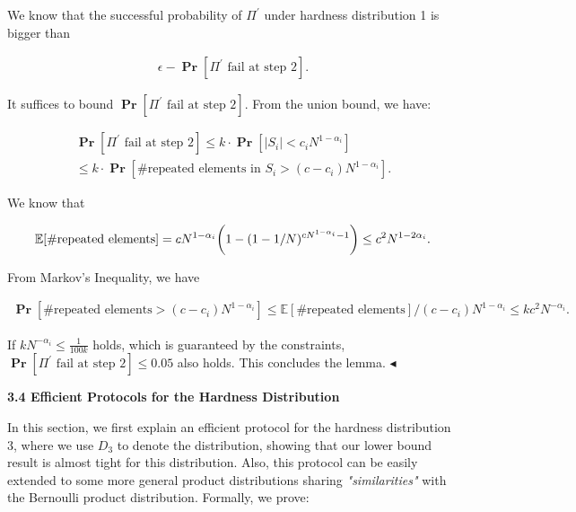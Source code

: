 \documentclass[10pt,a4paper]{article}
\begin{document}
We know that the successful probability of $\Pi^{\prime}$ under hardness distribution 1 is bigger than\par


\[\begin{gathered}
\epsilon-\operatorname*{\mathbf{Pr}}[\Pi^{\prime}\text{ fail at step 2}].
\end{gathered}\]


It suffices to bound $\operatorname*{\mathbf{Pr}}[\Pi^{\prime}\text{ fail at step 2}]$. From the union bound, we have:\par


\[\begin{gathered}
\displaystyle\operatorname*{\mathbf{Pr}}[\Pi^{\prime}\text{ fail at step 2}] \displaystyle\leq k\cdot\operatorname*{\mathbf{Pr}}[|S_{i}|<c_{i}N^{1-\alpha_{i}}] \\
\displaystyle\leq k\cdot\operatorname*{\mathbf{Pr}}[\#\text{repeated elements in $S_{i}$}>(c-c_{i})N^{1-\alpha_{i}}].
\end{gathered}\]


We know that\par


\[\begin{gathered}
\mathbb{E}[\#\text{repeated elements}]=cN^{1-\alpha_{i}}\bigg{(}1-(1-1/N)^{cN^{1-\alpha_{i}}-1}\bigg{)}\leq c^{2}N^{1-2\alpha_{i}}.
\end{gathered}\]


From Markov’s Inequality, we have\par


\[\begin{gathered}
\operatorname*{\mathbf{Pr}}[\#\text{repeated elements}>(c-c_{i})N^{1-\alpha_{i}}]\leq\mathbb{E}[\#\text{repeated elements}]/(c-c_{i})N^{1-\alpha_{i}}\leq kc^{2}N^{-\alpha_{i}}.
\end{gathered}\]


If $kN^{-\alpha_{i}}\leq\frac{1}{100k}$ holds, which is guaranteed by the constraints, $\operatorname*{\mathbf{Pr}}[\Pi^{\prime}\text{ fail at step 2}]\leq 0.05$ also holds. This concludes the lemma.
$\blacktriangleleft$\par






\par\medskip\noindent\textbf{
3.4 Efficient Protocols for the Hardness Distribution}\par




In this section, we first explain an efficient protocol for the hardness distribution 3, where we use $D_{3}$ to denote the distribution, showing that our lower bound result is almost tight for this distribution. Also, this protocol can be easily extended to some more general product distributions sharing \emph{"similarities"} with the Bernoulli product distribution.
Formally, we prove:\par
\end{document}
